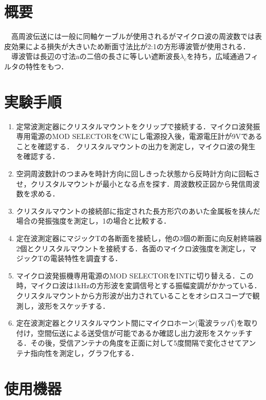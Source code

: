 \section{概要}
　高周波伝送には一般に同軸ケーブルが使用されるがマイクロ波の周波数では表皮効果による損失が大きいため断面寸法比が2:1の方形導波管が使用される．
　導波管は長辺の寸法aの二倍の長さに等しい遮断波長$\lambda_c$を持ち，広域通過フィルタの特性をもつ．

\section{実験手順\label{jikken}}
\begin{enumerate}
    \item 定常波測定器にクリスタルマウントをクリップで接続する．マイクロ波発振専用電源のMOD SELECTORをCWにし電源投入後，電源電圧計が9Vであることを確認する．
    クリスタルマウントの出力を測定し，マイクロ波の発生を確認する．

    \item 空洞周波数計のつまみを時計方向に回しきった状態から反時計方向に回転させ，クリスタルマウントが最小となる点を探す．周波数校正図から発信周波数を求める．
    \item クリスタルマウントの接続部に指定された長方形穴のあいた金属板を挟んだ場合の発振強度を測定し，1の場合と比較する．

    \item 定在波測定器にマジックTの各断面を接続し，他の3個の断面に向反射終端器2個とクリスタルマウントを接続する．各面のマイクロ波強度を測定し，マジックTの電装特性を調査する．

    \item マイクロ波発振機専用電源のMOD SELECTORをINTに切り替える．この時，マイクロ波は1kHzの方形波を変調信号とする振幅変調がかかっている．クリスタルマウントから方形波が出力されていることをオシロスコープで観測し，波形をスケッチする．

    \item 定在波測定器とクリスタルマウント間にマイクロホーン(電波ラッパ)を取り付け，空間伝送による送受信が可能であるか確認し出力波形をスケッチする．その後，受信アンテナの角度を正面に対して5度間隔で変化させてアンテナ指向性を測定し，グラフ化する．
\end{enumerate}

\newpage

\section{使用機器\label{kiki}}
